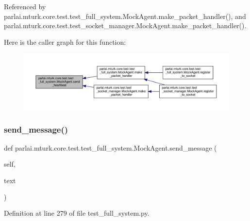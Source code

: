 Referenced by parlai.\+mturk.\+core.\+test.\+test\+\_\+full\+\_\+system.\+Mock\+Agent.\+make\+\_\+packet\+\_\+handler(), and parlai.\+mturk.\+core.\+test.\+test\+\_\+socket\+\_\+manager.\+Mock\+Agent.\+make\+\_\+packet\+\_\+handler().

Here is the caller graph for this function\+:
\nopagebreak
\begin{figure}[H]
\begin{center}
\leavevmode
\includegraphics[width=350pt]{classparlai_1_1mturk_1_1core_1_1test_1_1test__full__system_1_1MockAgent_a42f7589517cdf4c6a10b9a80e9afea1a_icgraph}
\end{center}
\end{figure}
\mbox{\label{classparlai_1_1mturk_1_1core_1_1test_1_1test__full__system_1_1MockAgent_a6eaaac34d4b7644c88bab53eeb12ebb1}} 
\subsubsection{\texorpdfstring{send\+\_\+message()}{send\_message()}}
{\footnotesize\ttfamily def parlai.\+mturk.\+core.\+test.\+test\+\_\+full\+\_\+system.\+Mock\+Agent.\+send\+\_\+message (\begin{DoxyParamCaption}\item[{}]{self,  }\item[{}]{text }\end{DoxyParamCaption})}



Definition at line 279 of file test\+\_\+full\+\_\+system.\+py.



